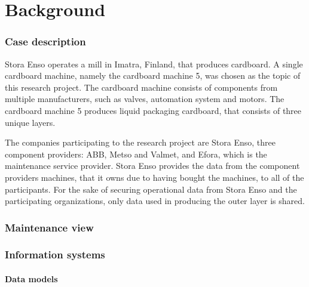 \chapter{Background}
\label{chapter:background}

\subsection{Case description}

Stora Enso operates a mill in Imatra, Finland, that produces cardboard. A single cardboard machine, namely the cardboard machine 5, was chosen as the topic of this research project. The cardboard machine consists of components from multiple manufacturers, such as valves, automation system and motors. The cardboard machine 5 produces liquid packaging cardboard, that consists of three unique layers. 

The companies participating to the research project are Stora Enso, three component providers: ABB, Metso and Valmet, and Efora, which is the maintenance service provider. Stora Enso provides the data from the component providers machines, that it owns due to having bought the machines, to all of the participants. For the sake of securing operational data from Stora Enso and the participating organizations, only data used in producing the outer layer is shared.










\subsection{Maintenance view}

\subsection{Information systems}

\subsubsection{Data models}
